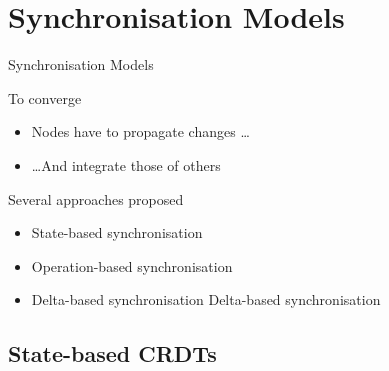 \section{Synchronisation Models}

\begin{frame}{Synchronisation Models}
    \begin{block}{To converge}
        \begin{itemize}
            \item Nodes have to propagate changes \dots
            \item \dots And integrate those of others
        \end{itemize}
    \end{block}
    \pause
    \begin{block}{Several approaches proposed \cite{shapiro_2011_crdt}}
        \begin{itemize}
            \item State-based synchronisation
            \item Operation-based synchronisation
            \item<3->
                 {Delta-based synchronisation \cite{Almeida_2018}}
                 {\color{gray} Delta-based synchronisation \cite{Almeida_2018}}
        \end{itemize}
    \end{block}
\end{frame}

\subsection{State-based CRDTs}

